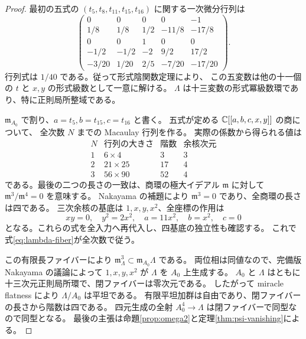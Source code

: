 \begin{proof}
最初の五式の $(t_5,t_8,t_{11},t_{15},t_{16})$ に関する一次微分行列は
\[
\begin{pmatrix}
0&0&0&0&-1\\
1/8&1/8&1/2&-11/8&-17/8\\
0&0&1&0&0\\
-1/2&-1/2&-2&9/2&17/2\\
-3/20&1/20&2/5&-7/20&-17/20
\end{pmatrix}.
\]
行列式は $1/40$ である。従って形式陰関数定理により、
この五変数は他の十一個の $t$ と $x,y$ の形式級数として一意に解ける。
$\Lambda$ は十三変数の形式冪級数環であり、特に正則局所整域である。

$\mathfrak m_{A_0}$ で割り、$a=t_5,b=t_{15},c=t_{16}$ と書く。
五式が定める $\mathbb C[[a,b,c,x,y]]$ の商について、
全次数 $N$ までの Macaulay 行列を作る。
実際の係数から得られる値は
\[
\begin{array}{c|c|c|c}
N&\text{行列の大きさ}&\text{階数}&\text{余核次元}\\\hline
1&6\times4&3&3\\
2&21\times25&17&4\\
3&56\times90&52&4
\end{array}
\]
である。最後の二つの長さの一致は、商環の極大イデアル $\mathfrak m$ に対して
$\mathfrak m^3/\mathfrak m^4=0$ を意味する。
Nakayama の補題により $\mathfrak m^3=0$ であり、全商環の長さは四である。
三次余核の基底は $1,x,y,x^2$、全座標の作用は
\[
xy=0,\quad y^2=2x^2,\quad
a=11x^2,\quad b=x^2,\quad c=0
\]
となる。これらの式を全入力へ再代入し、四基底の独立性も確認する。
これで式\eqref{eq:lambda-fiber}が全次数で従う。

この有限長ファイバーにより
$\mathfrak m_\Lambda^3\subset\mathfrak m_{A_0}\Lambda$ である。
両位相は同値なので、完備版 Nakayama の議論によって
$1,x,y,x^2$ が $\Lambda$ を $A_0$ 上生成する。
$A_0$ と $\Lambda$ はともに十三次元正則局所環で、閉ファイバーは零次元である。
したがって miracle flatness \cite[Tag 00R4]{Stacks} により $\Lambda/A_0$ は平坦である。
有限平坦加群は自由であり、閉ファイバーの長さから階数は四である。
四元生成の全射 $A_0^4\to\Lambda$ は閉ファイバーで同型なので同型となる。
最後の主張は命題\ref{prop:omega2}と定理\ref{thm:psi-vanishing}による。
\end{proof}






